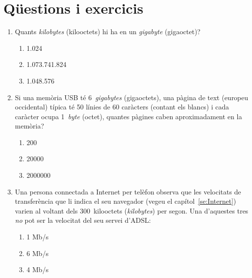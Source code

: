 \section{Qüestions i exercicis}
\begin{enumerate}
\item Quants \emph{kilobytes} (kilooctets) hi ha en un \emph{gigabyte}
  (gigaoctet)?
  \begin{enumerate}
  \item 1.024
  \item 1.073.741.824
  \item 1.048.576
  \end{enumerate}
  
\item Si una memòria USB té 6~\emph{gigabytes} (gigaoctets), una
  pàgina de text (europeu occidental) típica té 50 línies de 60
  caràcters (contant els blancs) i cada caràcter ocupa 1~\emph{byte}
  (octet), quantes pàgines caben aproximadament en la memòria?
  \begin{enumerate}
  \item 200
  \item 20000
  \item 2000000 
  \end{enumerate}

\item Una persona connectada a Internet per telèfon observa que les
  velocitats de transferència que li indica el seu navegador (vegeu el
  capítol~\ref{se:Internet}) varien al voltant dels 300~kilooctets
  (\emph{kilobytes}) per segon. Una d'aquestes tres \emph{no} pot ser
  la velocitat del seu servei d'ADSL:
  \begin{enumerate}
  \item 1 Mb/s
  \item 6 Mb/s
  \item 4 Mb/s
  \end{enumerate}
  


\end{enumerate}
